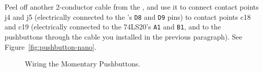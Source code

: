 Peel off another 2-conductor cable from the \rainbow, and use
it to connect contact points j4 and j5 (electrically connected to the \nano's
\texttt{D8} and \texttt{D9} pins) to contact points c18 and c19 (electrically
connected to the 74LS20's \texttt{A1} and \texttt{B1}, and to the pushbuttons
through the cable you installed in the previous paragraph). See
Figure~\ref{fig:pushbutton-nano}.

\begin{figure}\begin{multicols}{2}
    \centering
    \columnbreak


    \end{multicols}
    \caption{Wiring the Momentary Pushbuttons.}
\end{figure}

